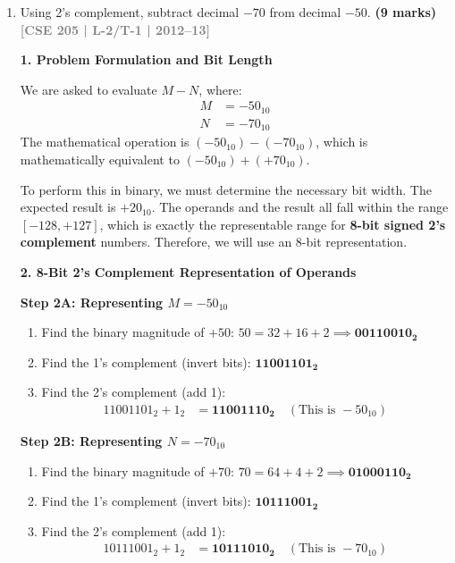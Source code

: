 \documentclass[12pt,a3paper]{article}
\newcommand{\yr}[1]{\hfill\textcolor{gray}{\small\textbf{[#1]}}}
\newcommand{\mk}[1]{\textcolor{orange!70!black}{\small\textbf{(#1 marks)}}}
\begin{document}
\begin{enumerate}
\begin{tcolorbox}[enhanced,breakable,ansbox,colback=cD!4,colframe=cD,boxrule=0.8pt,arc=5pt,title={\textbf{Answer}},fonttitle=\bfseries\color{white},colbacktitle=cD]
\end{tcolorbox}

\item Using 2's complement, subtract decimal $-70$ from decimal $-50$.
\mk{9} \yr{CSE 205 | L-2/T-1 | 2012--13}

\begin{tcolorbox}[enhanced,breakable,ansbox,colback=cD!4,colframe=cD,boxrule=0.8pt,arc=5pt,title={\textbf{Answer}},fonttitle=\bfseries\color{white},colbacktitle=cD]

\textbf{\textcolor{cD}{1. Problem Formulation and Bit Length}}

We are asked to evaluate $M - N$, where:
\begin{align*}
    M &= -50_{10} \\
    N &= -70_{10}
\end{align*}
The mathematical operation is $(-50_{10}) - (-70_{10})$, which is mathematically equivalent to $(-50_{10}) + (+70_{10})$. 

To perform this in binary, we must determine the necessary bit width. The expected result is $+20_{10}$. The operands and the result all fall within the range $[-128, +127]$, which is exactly the representable range for \textbf{8-bit signed 2's complement} numbers. Therefore, we will use an 8-bit representation.

\vspace{1em}
\textbf{\textcolor{cD}{2. 8-Bit 2's Complement Representation of Operands}}

\textbf{Step 2A: Representing $M = -50_{10}$}
\begin{enumerate}[label=\roman*.]
    \item Find the binary magnitude of $+50$: $50 = 32 + 16 + 2 \implies \mathbf{00110010_2}$
    \item Find the 1's complement (invert bits): $\mathbf{11001101_2}$
    \item Find the 2's complement (add 1): 
    \begin{align*}
        11001101_2 + 1_2 &= \mathbf{11001110_2} \quad (\text{This is } -50_{10})
    \end{align*}
\end{enumerate}

\textbf{Step 2B: Representing $N = -70_{10}$}
\begin{enumerate}[label=\roman*.]
    \item Find the binary magnitude of $+70$: $70 = 64 + 4 + 2 \implies \mathbf{01000110_2}$
    \item Find the 1's complement (invert bits): $\mathbf{10111001_2}$
    \item Find the 2's complement (add 1): 
    \begin{align*}
        10111001_2 + 1_2 &= \mathbf{10111010_2} \quad (\text{This is } -70_{10})
    \end{align*}
\end{enumerate}


\end{tcolorbox}
\end{enumerate}
\end{document}
